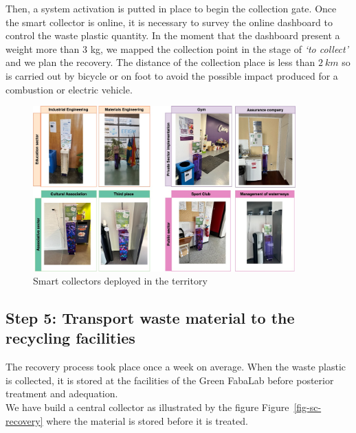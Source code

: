 \documentclass[
  11pt,
]{article}
\begin{document}
Then, a system activation is putted in place to begin the collection
gate. Once the smart collector is online, it is necessary to survey the
online dashboard to control the waste plastic quantity. In the moment
that the dashboard present a weight more than 3 kg, we mapped the
collection point in the stage of \emph{`to collect'} and we plan the
recovery. The distance of the collection place is less than \(2~km\) so
is carried out by bicycle or on foot to avoid the possible impact
produced for a combustion or electric vehicle.

\begin{figure}[H]

{\centering \includegraphics[width=0.9\textwidth,height=\textheight]{figures/SC/Smart-Collectors.jpg}

}

\caption{\label{fig-sc-flyer}Smart collectors deployed in the territory}

\end{figure}

\hypertarget{step-5-transport-waste-material-to-the-recycling-facilities}{%
\subsection{Step 5: Transport waste material to the recycling
facilities}\label{step-5-transport-waste-material-to-the-recycling-facilities}}

The recovery process took place once a week on average. When the waste
plastic is collected, it is stored at the facilities of the Green
FabaLab before posterior treatment and adequation.\\
We have build a central collector as illustrated by the figure
Figure~\ref{fig-sc-recovery} where the material is stored before it is
treated.
\end{document}
